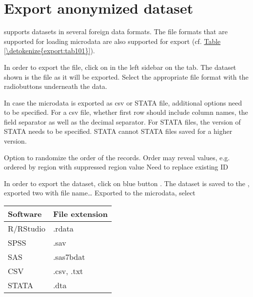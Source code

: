 \documentclass[letterpaper,10pt,english]{sphinxmanual}
\begin{document}
\section{Export anonymized dataset}
\label{\detokenize{export:export-anonymized-dataset}}
 supports datasets in several foreign data formats. The file formats that are
supported for loading microdata are also supported for export (cf. \hyperref[\detokenize{export:tab101}]{Table \ref{\detokenize{export:tab101}}}).

In order to export the file, click on   in the left sidebar on the
 tab. The dataset shown is the file as it will be exported. Select the
appropriate file format with the radiobuttons underneath the data.

In case the microdata is exported as csv or STATA file, additional options need to
be specified. For a csv file, whether first row should include column names,
the field separator as well as the decimal separator. For STATA files, the version of STATA
needs to be specified. STATA cannot STATA files saved for a higher version.

Option to randomize the order of the records. Order may reveal values, e.g.
ordered by region with suppressed region value Need to replace existing ID

In order to export the dataset, click on blue button . The dataset is saved
to the
, exported two with file name… Exported to
the microdata, select


\begin{savenotes}\sphinxattablestart
\centering
{}
\label{\detokenize{export:tab101}}\label{\detokenize{export:id1}}
\sphinxaftercaption
\begin{tabulary}{\linewidth}[t]{|T|T|}
\hline
\sphinxstyletheadfamily 
Software
&\sphinxstyletheadfamily 
File extension
\\
\hline
R/RStudio
&
.rdata
\\
\hline
SPSS
&
.sav
\\
\hline
SAS
&
.sas7bdat
\\
\hline
CSV
&
.csv, .txt
\\
\hline
STATA
&
.dta
\\
\hline
\end{tabulary}
\par
\sphinxattableend\end{savenotes}
\end{document}
